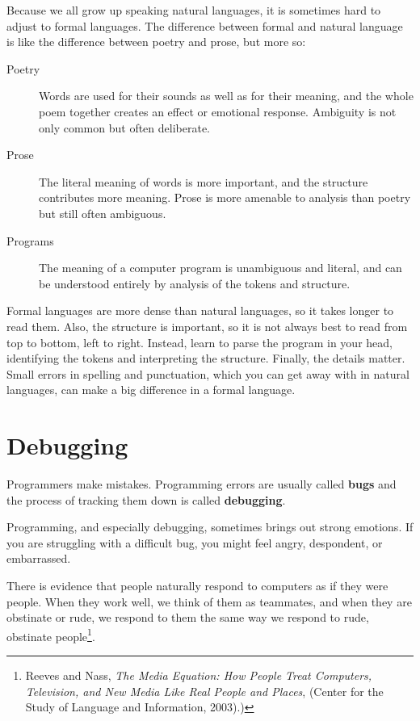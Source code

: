 Because we all grow up speaking natural languages, it is sometimes
hard to adjust to formal languages.  The difference between formal and
natural language is like the difference between poetry and prose, but
more so:  

\begin{description}

\item[Poetry] Words are used for their sounds as well as for
their meaning, and the whole poem together creates an effect or
emotional response.  Ambiguity is not only common but often
deliberate.

\item[Prose] The literal meaning of words is more important,
and the structure contributes more meaning.  Prose is more amenable to
analysis than poetry but still often ambiguous.

\item[Programs] The meaning of a computer program is unambiguous
and literal, and can be understood entirely by analysis of the
tokens and structure.

\end{description}

Formal languages are more dense
than natural languages, so it takes longer to read them.  Also, the
structure is important, so it is not always best to read
from top to bottom, left to right.  Instead, learn to parse the
program in your head, identifying the tokens and interpreting the
structure.  Finally, the details matter.  Small errors in
spelling and punctuation, which you can get away
with in natural languages, can make a big difference in a formal
language.


\section{Debugging}

Programmers make mistakes.  Programming errors are usually 
called {\bf bugs} and the process of tracking them down is called
{\bf debugging}.

Programming, and especially debugging, sometimes brings out strong
emotions.  If you are struggling with a difficult bug, you might 
feel angry, despondent, or embarrassed.

There is evidence that people naturally respond to computers as if
they were people.  When they work well, we think
of them as teammates, and when they are obstinate or rude, we
respond to them the same way we respond to rude,
obstinate people\footnote{Reeves and Nass, {\it The Media
    Equation: How People Treat Computers, Television, and New Media
    Like Real People and Places}, (Center for the Study of Language and Information, 2003).)}.

